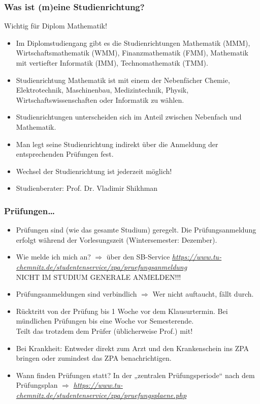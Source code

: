 \documentclass[10pt]{beamer}
\makeatletter
\newcommand{\highl}[1]{\color{tuccolor@ma}#1\color{black}}
\makeatother
\begin{document}
\begin{frame}
	\frametitle{Was ist (m)eine Studienrichtung?}

	\highl{Wichtig für Diplom Mathematik!}

	\begin{itemize}
		\item Im Diplomstudiengang gibt es die Studienrichtungen Mathematik (MMM), Wirtschaftsmathematik (WMM), Finanzmathematik (FMM), Mathematik mit vertiefter Informatik (IMM), Technomathematik (TMM).
		\item Studienrichtung Mathematik ist mit einem der Nebenfächer Chemie, Elektrotechnik, Maschinenbau, Medizintechnik, Physik, Wirtschaftswissenschaften oder Informatik zu wählen.
		\item Studienrichtungen unterscheiden sich im Anteil zwischen Nebenfach und Mathematik.
		\item Man legt seine Studienrichtung indirekt über die Anmeldung der entsprechenden Prüfungen fest.
		\item Wechsel der Studienrichtung ist jederzeit möglich!
		\item Studienberater: Prof. Dr. Vladimir Shikhman
	\end{itemize}
\end{frame}

\begin{frame}
	\frametitle{Prüfungen\dots}

	\begin{itemize}
		\item Prüfungen sind (wie das gesamte Studium) geregelt. Die Prüfungsanmeldung erfolgt während der Vorlesungszeit (Wintersemester: Dezember).
		\item Wie melde ich mich an? $\Rightarrow$ über den SB-Service \highl{\textit{\href{https://www.tu-chemnitz.de/studentenservice/zpa/pruefungsanmeldung}{https://www.tu-chemnitz.de/studentenservice/zpa/pruefungsanmeldung}}} \\
		\highl{NICHT IM STUDIUM GENERALE ANMELDEN!!!}
		\item Prüfungsanmeldungen sind verbindlich $\Rightarrow$ Wer nicht auftaucht, fällt durch. 
		\item Rücktritt von der Prüfung bis 1 Woche vor dem Klausurtermin. Bei mündlichen Prüfungen bis eine Woche vor Semesterende.\\
		\highl{Teilt das trotzdem dem Prüfer (üblicherweise Prof.) mit!}
		\item Bei Krankheit: Entweder direkt zum Arzt und den Krankenschein ins ZPA bringen oder zumindest das ZPA benachrichtigen.
		\item Wann finden Prüfungen statt? In der „zentralen Prüfungsperiode“ nach dem Prüfungsplan $\Rightarrow$ \highl{\textit{\href{https://www.tu-chemnitz.de/studentenservice/zpa/pruefungsplaene.php}{https://www.tu-chemnitz.de/studentenservice/zpa/pruefungsplaene.php}}}
	\end{itemize}
\end{frame}
\end{document}
